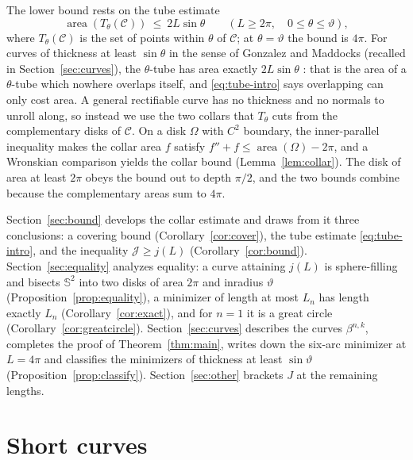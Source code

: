 \documentclass[11pt,oneside,reqno]{amsart}
\theoremstyle{plain}
\theoremstyle{definition}
\DeclareMathOperator{\area}{area}
\newcommand{\Sph}{\mathbb{S}^{2}}
\newcommand{\bta}[2]{\beta^{#1,#2}}
\begin{document}
The lower bound rests on the tube estimate
\begin{equation}\label{eq:tube-intro}
  \area(T_{\theta}(\mathcal{C}))\ \le\ 2L\sin\theta
  \qquad(L\ge2\pi,\quad 0\le\theta\le\vartheta),
\end{equation}
where $T_{\theta}(\mathcal{C})$ is the set of points within $\theta$ of
$\mathcal{C}$; at $\theta=\vartheta$ the bound is $4\pi$. For curves of thickness
at least $\sin\theta$ in the sense of Gonzalez and Maddocks
\cite{GM99} (recalled in Section~\ref{sec:curves}), the $\theta$-tube has area
exactly $2L\sin\theta$ \cite[Prop.~1]{GvdM2011b}: that is the area of a
$\theta$-tube which nowhere overlaps itself, and \eqref{eq:tube-intro} says
overlapping can only cost area. A general rectifiable curve has no thickness
and no normals to unroll along, so instead we use the two collars that
$T_{\theta}$ cuts from the complementary disks of $\mathcal{C}$. On a disk $\Omega$ with $C^{2}$ boundary, the inner-parallel
inequality \cite{Hartman64} makes the collar area $f$ satisfy
$f''+f\le\area(\Omega)-2\pi$, and a Wronskian comparison yields the collar
bound (Lemma~\ref{lem:collar}). The disk of area at least $2\pi$ obeys the bound out
to depth $\pi/2$, and the two bounds combine because the complementary areas sum
to $4\pi$.

Section~\ref{sec:bound} develops the collar estimate and draws from it three
conclusions: a covering bound (Corollary~\ref{cor:cover}), the tube estimate
\eqref{eq:tube-intro}, and the inequality $\mathcal{J}\ge j(L)$
(Corollary~\ref{cor:bound}). Section~\ref{sec:equality} analyzes equality: a curve
attaining $j(L)$ is sphere-filling and bisects $\Sph$ into two disks of area
$2\pi$ and inradius $\vartheta$ (Proposition~\ref{prop:equality}), a minimizer of
length at most $L_{n}$ has length exactly $L_{n}$
(Corollary~\ref{cor:exact}), and for $n=1$ it is a great circle
(Corollary~\ref{cor:greatcircle}). Section~\ref{sec:curves} describes the
curves $\bta{n}{k}$, completes the proof of Theorem~\ref{thm:main}, writes down
the six-arc minimizer at $L=4\pi$ and classifies the minimizers of thickness at
least $\sin\vartheta$ (Proposition~\ref{prop:classify}). Section~\ref{sec:other}
brackets $J$ at the remaining lengths.

\section{Short curves}\label{sec:short}
\end{document}
